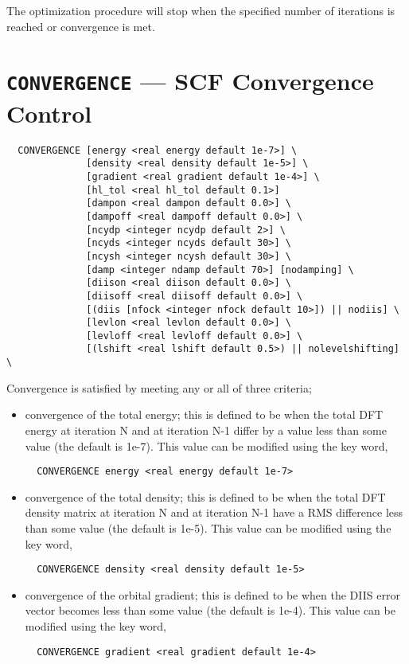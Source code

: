 The optimization procedure will stop when the specified number of
iterations is reached or convergence is met.

\section{{\tt CONVERGENCE} --- SCF Convergence Control}

\begin{verbatim}
  CONVERGENCE [energy <real energy default 1e-7>] \
              [density <real density default 1e-5>] \
              [gradient <real gradient default 1e-4>] \
              [hl_tol <real hl_tol default 0.1>]
              [dampon <real dampon default 0.0>] \
              [dampoff <real dampoff default 0.0>] \
              [ncydp <integer ncydp default 2>] \
              [ncyds <integer ncyds default 30>] \
              [ncysh <integer ncysh default 30>] \
              [damp <integer ndamp default 70>] [nodamping] \
              [diison <real diison default 0.0>] \
              [diisoff <real diisoff default 0.0>] \
              [(diis [nfock <integer nfock default 10>]) || nodiis] \
              [levlon <real levlon default 0.0>] \
              [levloff <real levloff default 0.0>] \
              [(lshift <real lshift default 0.5>) || nolevelshifting] \
\end{verbatim}

Convergence is satisfied by meeting any or all of three criteria;
\begin{itemize}
\item convergence of the total energy; this is defined to be when the
  total DFT energy at iteration N and at iteration N-1 differ by a value less
  than some value (the default is 1e-7).  This value can be modified
  using the key word,
\begin{verbatim}
  CONVERGENCE energy <real energy default 1e-7>
\end{verbatim}

\item convergence of the total density; this is defined to be when the
  total DFT density matrix at iteration N and at iteration N-1 have a
  RMS difference less than some value (the default is 1e-5).  This value can be modified
  using the key word,
\begin{verbatim}
  CONVERGENCE density <real density default 1e-5>
\end{verbatim}

\item convergence of the orbital gradient; this is defined to be when the
  DIIS error vector becomes less than some value (the default is
  1e-4).  This value can be modified using the key word,
\begin{verbatim}
  CONVERGENCE gradient <real gradient default 1e-4>
\end{verbatim}
\end{itemize}

